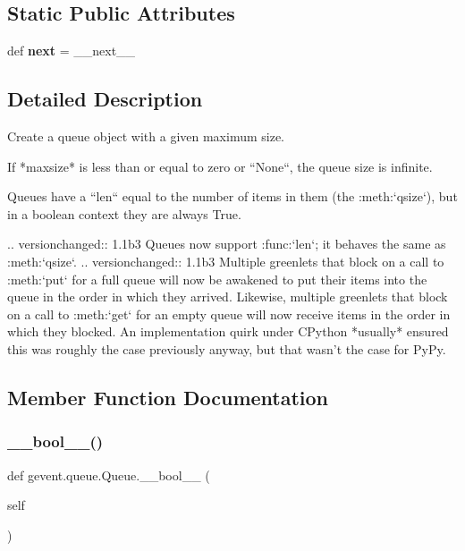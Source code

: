 \subsection*{Static Public Attributes}
\begin{DoxyCompactItemize}
\item 
\mbox{\label{classgevent_1_1queue_1_1_queue_aefb02f774ed4cdf1a57bddcfdc23f7ba}} 
def {\bfseries next} = \+\_\+\+\_\+next\+\_\+\+\_\+
\end{DoxyCompactItemize}


\subsection{Detailed Description}
\begin{DoxyVerb}Create a queue object with a given maximum size.

If *maxsize* is less than or equal to zero or ``None``, the queue
size is infinite.

Queues have a ``len`` equal to the number of items in them (the :meth:`qsize`),
but in a boolean context they are always True.

.. versionchanged:: 1.1b3
   Queues now support :func:`len`; it behaves the same as :meth:`qsize`.
.. versionchanged:: 1.1b3
   Multiple greenlets that block on a call to :meth:`put` for a full queue
   will now be awakened to put their items into the queue in the order in which
   they arrived. Likewise, multiple greenlets that block on a call to :meth:`get` for
   an empty queue will now receive items in the order in which they blocked. An
   implementation quirk under CPython *usually* ensured this was roughly the case
   previously anyway, but that wasn't the case for PyPy.
\end{DoxyVerb}
 

\subsection{Member Function Documentation}
\mbox{\label{classgevent_1_1queue_1_1_queue_a43c38488ce8958ca9ae2b6117c1b22ed}} 
\subsubsection{\texorpdfstring{\+\_\+\+\_\+bool\+\_\+\+\_\+()}{\_\_bool\_\_()}}
{\footnotesize\ttfamily def gevent.\+queue.\+Queue.\+\_\+\+\_\+bool\+\_\+\+\_\+ (\begin{DoxyParamCaption}\item[{}]{self }\end{DoxyParamCaption})}

